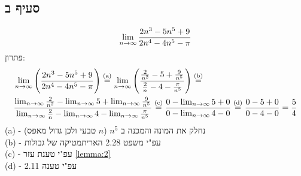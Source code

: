 \documentclass{article}
\begin{document}
\subsection*{סעיף ב}
\[ \lim_{n \to \infty} \frac{2n^3-5n^5 + 9}{2n^4 - 4n^5 - \pi} \]
פתרון:
\begin{align*}
	&\lim_{n \to \infty} \Bigg( \frac{2n^3-5n^5 + 9}{2n^4 - 4n^5 - \pi} \Bigg) \overset{\text{(a)}}=
	\lim_{n \to \infty} \Bigg( \frac{\frac{2}{n^2}-5 + \frac{9}{n^5}}{\frac{2}{n} - 4 - \frac{\pi}{n^5}} \Bigg) \overset{\text{(b)}}= \\
	&\frac{\lim_{n \to \infty}\frac{2}{n^2} - \lim_{n \to \infty} 5 + \lim_{n \to \infty}\frac{9}{n^5}}{\lim_{n \to \infty}\frac{2}{n} - \lim_{n \to \infty}4 - \lim_{n \to \infty}\frac{\pi}{n^5}} \overset{\text{(c)}}=
	\frac{0 - \lim_{n \to \infty} 5 + 0}{0 - \lim_{n \to \infty}4 - 0} \overset{\text{(d)}}=
	\frac{0 - 5 + 0}{0 - 4 - 0} =
	\frac{5}{4}
\end{align*}
(a) -
נחלק את המונה והמכנה ב $n^5$ ($n$ טבעי ולכן גדול מאפס) \\
(b) -
עפ"י משפט 2.28 האריתמטיקה של גבולות \\
(c) -
עפ"י טענת עזר \ref{lemma:2} \\
(d) -
עפ"י טענה 2.11
\end{document}
